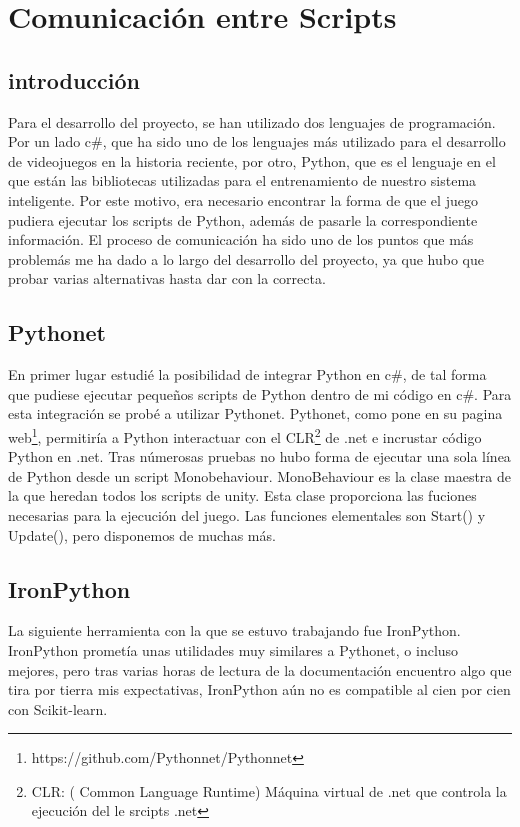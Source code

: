 \section{Comunicación entre Scripts}

\subsection{introducción}
Para el desarrollo del proyecto, se han utilizado dos lenguajes de programación. Por un lado c\#, que ha sido uno de los lenguajes más utilizado para el desarrollo de videojuegos en la historia reciente, por otro, Python, que es el lenguaje en el que están las bibliotecas utilizadas para el entrenamiento de nuestro sistema inteligente. Por este motivo, era necesario encontrar la forma de que el juego pudiera ejecutar los scripts de Python, además de pasarle la correspondiente información. El proceso de comunicación ha sido uno de los puntos que más problemás me ha dado a lo largo del desarrollo del proyecto, ya que hubo que probar varias alternativas hasta dar con la correcta.

\subsection{Pythonet}
En primer lugar estudié la posibilidad de integrar Python en c\#, de tal forma que pudiese ejecutar pequeños scripts de Python dentro de mi código en c\#. Para esta integración se probé a utilizar Pythonet. Pythonet, como pone en su pagina web\footnote{https://github.com/Pythonnet/Pythonnet}, permitiría a Python interactuar con el CLR\footnote{CLR: ( Common Language Runtime) Máquina virtual de .net que controla la ejecución del le srcipts .net} de .net e incrustar código Python en .net. Tras númerosas pruebas no hubo forma de ejecutar una sola línea de Python desde un script Monobehaviour. MonoBehaviour es la clase maestra de la que heredan todos los scripts de unity. Esta clase proporciona las fuciones necesarias para la ejecución del juego. Las funciones elementales son Start() y Update(), pero disponemos de muchas más. 


\subsection{IronPython}
La siguiente herramienta con la que se estuvo trabajando fue IronPython. IronPython prometía unas utilidades muy similares a Pythonet, o incluso mejores, pero tras varias horas de lectura de la documentación encuentro algo que tira por tierra mis expectativas, IronPython aún no es compatible al cien por cien con Scikit-learn.

